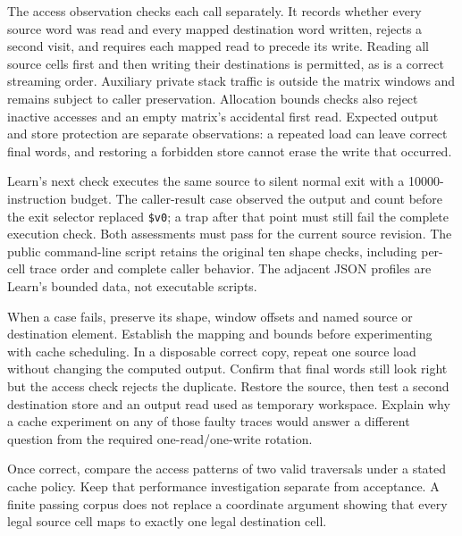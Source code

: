 The access observation checks each call separately. It records whether every
source word was read and every mapped destination word written, rejects a
second visit, and requires each mapped read to precede its write. Reading all
source cells first and then writing their destinations is permitted, as is a
correct streaming order. Auxiliary private stack traffic is outside the matrix
windows and remains subject to caller preservation. Allocation bounds checks
also reject inactive accesses and an empty matrix's accidental first read.
Expected output and store protection are separate observations: a repeated load
can leave correct final words, and restoring a forbidden store cannot erase
the write that occurred.

Learn's next check executes the same source to silent normal exit with a
10000-instruction budget. The caller-result case observed the output and count
before the exit selector replaced \texttt{\$v0}; a trap after that point must
still fail the complete execution check. Both assessments must pass for the
current source revision. The public command-line script retains the original
ten shape checks, including per-cell trace order and complete caller behavior.
The adjacent JSON profiles are Learn's bounded data, not executable scripts.

When a case fails, preserve its shape, window offsets and named source or
destination element. Establish the mapping and bounds before experimenting
with cache scheduling. In a disposable correct copy, repeat one source load
without changing the computed output. Confirm that final words still look right
but the access check rejects the duplicate. Restore the source, then test a
second destination store and an output read used as temporary workspace.
Explain why a cache experiment on any of those faulty traces would answer a
different question from the required one-read/one-write rotation.

Once correct, compare the access patterns of two valid traversals under a stated
cache policy. Keep that performance investigation separate from acceptance.
A finite passing corpus does not replace a coordinate argument showing that
every legal source cell maps to exactly one legal destination cell.
